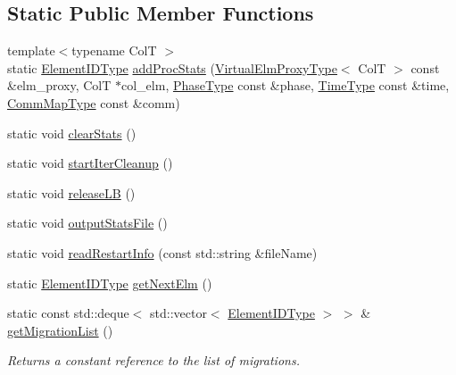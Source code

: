 \subsection*{Static Public Member Functions}
\begin{DoxyCompactItemize}
\item 
{\footnotesize template$<$typename ColT $>$ }\\static \hyperlink{namespacevt_1_1vrt_1_1collection_1_1balance_a14c8d2c972f2913aa3f1636e5be0a120}{Element\+I\+D\+Type} \hyperlink{structvt_1_1vrt_1_1collection_1_1balance_1_1_proc_stats_ae9ec0e9f6af7d5e84c2260170a56c611}{add\+Proc\+Stats} (\hyperlink{namespacevt_1_1vrt_a620a5c8c59d13e513f690c74b4af516f}{Virtual\+Elm\+Proxy\+Type}$<$ ColT $>$ const \&elm\+\_\+proxy, ColT $\ast$col\+\_\+elm, \hyperlink{namespacevt_a46ce6733d5cdbd735d561b7b4029f6d7}{Phase\+Type} const \&phase, \hyperlink{namespacevt_a876a9d0cd5a952859c72de8a46881442}{Time\+Type} const \&time, \hyperlink{namespacevt_1_1vrt_1_1collection_1_1balance_aa50d4cbbfa3c643e7303fc6e08f411fb}{Comm\+Map\+Type} const \&comm)
\item 
static void \hyperlink{structvt_1_1vrt_1_1collection_1_1balance_1_1_proc_stats_a9a47e5d00d2645f76f2a21e75996fe8b}{clear\+Stats} ()
\item 
static void \hyperlink{structvt_1_1vrt_1_1collection_1_1balance_1_1_proc_stats_a6b8af21b777599060c4a532a5adb0100}{start\+Iter\+Cleanup} ()
\item 
static void \hyperlink{structvt_1_1vrt_1_1collection_1_1balance_1_1_proc_stats_a7865efba4c984b1b77a93b5cd04dc861}{release\+LB} ()
\item 
static void \hyperlink{structvt_1_1vrt_1_1collection_1_1balance_1_1_proc_stats_a543211533c1c2c348137069e945432a5}{output\+Stats\+File} ()
\item 
static void \hyperlink{structvt_1_1vrt_1_1collection_1_1balance_1_1_proc_stats_aeceaaa1a82ec8e03b580fb4ec3b89ee3}{read\+Restart\+Info} (const std\+::string \&file\+Name)
\item 
static \hyperlink{namespacevt_1_1vrt_1_1collection_1_1balance_a14c8d2c972f2913aa3f1636e5be0a120}{Element\+I\+D\+Type} \hyperlink{structvt_1_1vrt_1_1collection_1_1balance_1_1_proc_stats_aff0ecd6f0016ebd074b982caad107806}{get\+Next\+Elm} ()
\item 
static const std\+::deque$<$ std\+::vector$<$ \hyperlink{namespacevt_1_1vrt_1_1collection_1_1balance_a14c8d2c972f2913aa3f1636e5be0a120}{Element\+I\+D\+Type} $>$ $>$ \& \hyperlink{structvt_1_1vrt_1_1collection_1_1balance_1_1_proc_stats_aa04cc1fc5b6a17b7d4613f77258542c8}{get\+Migration\+List} ()
\begin{DoxyCompactList}\small\item\em Returns a constant reference to the list of migrations. \end{DoxyCompactList}\end{DoxyCompactItemize}
